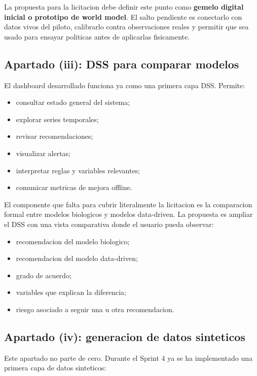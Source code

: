 ﻿\documentclass[11pt,a4paper]{article}
\begin{document}
La propuesta para la licitacion debe definir este punto como \textbf{gemelo digital inicial o prototipo de world model}. El salto pendiente es conectarlo con datos vivos del piloto, calibrarlo contra observaciones reales y permitir que sea usado para ensayar politicas antes de aplicarlas fisicamente.

\subsection{Apartado (iii): DSS para comparar modelos}

El dashboard desarrollado funciona ya como una primera capa DSS. Permite:

\begin{itemize}
    \item consultar estado general del sistema;
    \item explorar series temporales;
    \item revisar recomendaciones;
    \item visualizar alertas;
    \item interpretar reglas y variables relevantes;
    \item comunicar metricas de mejora offline.
\end{itemize}

El componente que falta para cubrir literalmente la licitacion es la comparacion formal entre modelos biologicos y modelos data-driven. La propuesta es ampliar el DSS con una vista comparativa donde el usuario pueda observar:

\begin{itemize}
    \item recomendacion del modelo biologico;
    \item recomendacion del modelo data-driven;
    \item grado de acuerdo;
    \item variables que explican la diferencia;
    \item riesgo asociado a seguir una u otra recomendacion.
\end{itemize}

\subsection{Apartado (iv): generacion de datos sinteticos}

Este apartado no parte de cero. Durante el Sprint 4 ya se ha implementado una primera capa de datos sinteticos:
\end{document}
